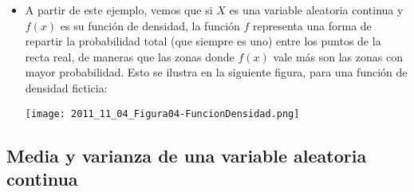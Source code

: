 \begin{itemize}
    \item A partir de este ejemplo, vemos que si $X$ es una variable aleatoria continua y  $f(x)$ es su función de densidad, la función $f$ representa una forma de repartir la probabilidad total (que siempre es uno) entre los puntos de la recta real, de maneras que las zonas donde $f(x)$ vale más son las zonas con mayor probabilidad. Esto se ilustra en la siguiente figura, para una función de densidad ficticia:
       \begin{center}
       \texttt{[image: 2011\_11\_04\_Figura04-FuncionDensidad.png]}
       \end{center}

\end{itemize}

\subsection*{Media y varianza de una variable aleatoria continua}

